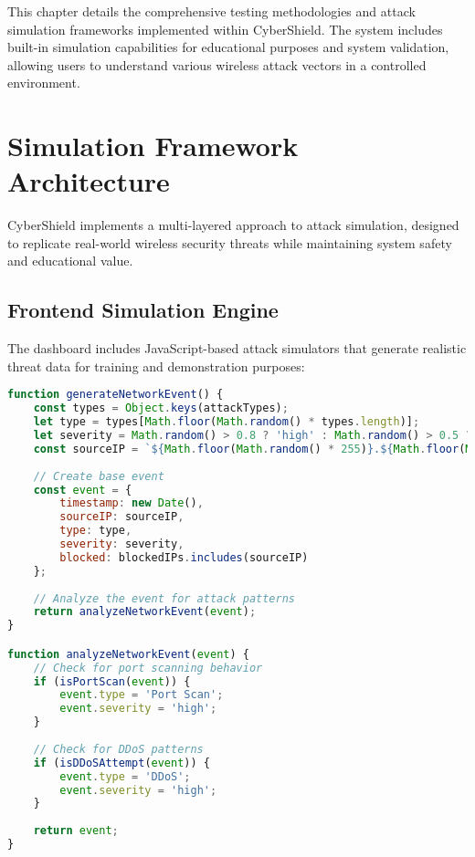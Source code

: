 \documentclass[12pt,a4paper]{report}
\begin{document}
This chapter details the comprehensive testing methodologies and attack simulation frameworks implemented within CyberShield. The system includes built-in simulation capabilities for educational purposes and system validation, allowing users to understand various wireless attack vectors in a controlled environment.

\section{Simulation Framework Architecture}

CyberShield implements a multi-layered approach to attack simulation, designed to replicate real-world wireless security threats while maintaining system safety and educational value.

\subsection{Frontend Simulation Engine}

The dashboard includes JavaScript-based attack simulators that generate realistic threat data for training and demonstration purposes:

\begin{lstlisting}[language=JavaScript,caption={Network Attack Event Generator}]
function generateNetworkEvent() {
    const types = Object.keys(attackTypes);
    let type = types[Math.floor(Math.random() * types.length)];
    let severity = Math.random() > 0.8 ? 'high' : Math.random() > 0.5 ? 'medium' : 'low';
    const sourceIP = `${Math.floor(Math.random() * 255)}.${Math.floor(Math.random() * 255)}.${Math.floor(Math.random() * 255)}.${Math.floor(Math.random() * 255)}`;
    
    // Create base event
    const event = {
        timestamp: new Date(),
        sourceIP: sourceIP,
        type: type,
        severity: severity,
        blocked: blockedIPs.includes(sourceIP)
    };
    
    // Analyze the event for attack patterns
    return analyzeNetworkEvent(event);
}

function analyzeNetworkEvent(event) {
    // Check for port scanning behavior
    if (isPortScan(event)) {
        event.type = 'Port Scan';
        event.severity = 'high';
    }
    
    // Check for DDoS patterns
    if (isDDoSAttempt(event)) {
        event.type = 'DDoS';
        event.severity = 'high';
    }
    
    return event;
}
\end{lstlisting}
\end{document}
